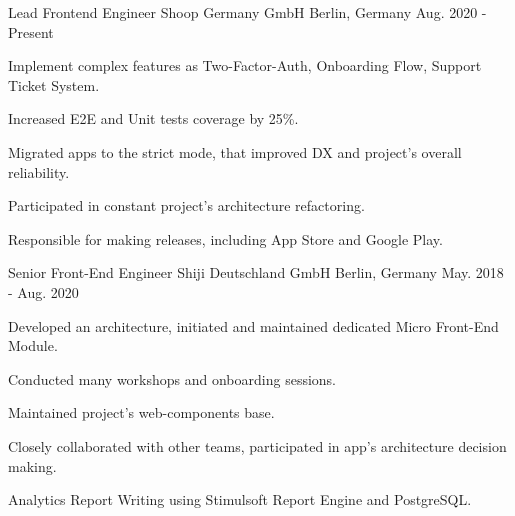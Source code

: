 

\begin{cventries}

  \cventry
    {Lead Frontend Engineer} %
    {Shoop Germany GmbH} %
    {Berlin, Germany} %
    {Aug. 2020 - Present} %
    {
      \begin{cvitems} %
        \item {Implement complex features as Two-Factor-Auth, Onboarding Flow, Support Ticket System.}
        \item {Increased E2E and Unit tests coverage by 25\%.}
        \item {Migrated apps to the strict mode, that improved DX and project’s overall reliability.}
        \item {Participated in constant project’s architecture refactoring.}
        \item {Responsible for making releases, including App Store and Google Play.}
      \end{cvitems}
    }

  \cventry
    {Senior Front-End Engineer} %
    {Shiji Deutschland GmbH} %
    {Berlin, Germany} %
    {May. 2018 - Aug. 2020} %
    {
      \begin{cvitems} %
        \item {Developed an architecture, initiated and maintained dedicated Micro Front-End Module.}
        \item {Conducted many workshops and onboarding sessions.}
        \item {Maintained project’s web-components base.}
        \item {Closely collaborated with other teams, participated in app’s architecture decision making.}
        \item {Analytics Report Writing using Stimulsoft Report Engine and PostgreSQL.}
      \end{cvitems}
    }


\end{cventries}
